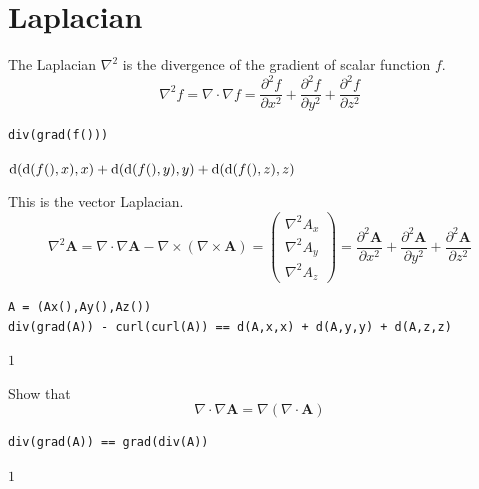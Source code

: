 
\newpage

\section{Laplacian}

The Laplacian $\nabla^2$ is the divergence of the gradient of scalar function $f$.
\begin{equation*}
\nabla^2f=\nabla\cdot\nabla f
=\frac{\partial^2 f}{\partial x^2}
+\frac{\partial^2 f}{\partial y^2}
+\frac{\partial^2 f}{\partial z^2}
\end{equation*}

{\color{blue}
\begin{verbatim}
div(grad(f()))
\end{verbatim}}

$\displaystyle
\operatorname{\rm d}(\operatorname{\rm d}(f(),x),x)
+\operatorname{\rm d}(\operatorname{\rm d}(f(),y),y)
+\operatorname{\rm d}(\operatorname{\rm d}(f(),z),z)
$

\bigskip
This is the vector Laplacian.
\begin{equation*}
\nabla^2\mathbf A
=\nabla\cdot\nabla\mathbf A-\nabla\times(\nabla\times\mathbf A)
=\begin{pmatrix}
\nabla^2A_x
\\
\nabla^2A_y
\\
\nabla^2A_z
\end{pmatrix}
=\frac{\partial^2\mathbf A}{\partial x^2}
+\frac{\partial^2\mathbf A}{\partial y^2}
+\frac{\partial^2\mathbf A}{\partial z^2}
\end{equation*}

{\color{blue}
\begin{verbatim}
A = (Ax(),Ay(),Az())
div(grad(A)) - curl(curl(A)) == d(A,x,x) + d(A,y,y) + d(A,z,z)
\end{verbatim}}

$1$

\bigskip
Show that
\begin{equation*}
\nabla\cdot\nabla\mathbf A=\nabla(\nabla\cdot\mathbf A)
\end{equation*}

{\color{blue}
\begin{verbatim}
div(grad(A)) == grad(div(A))
\end{verbatim}}

$1$


